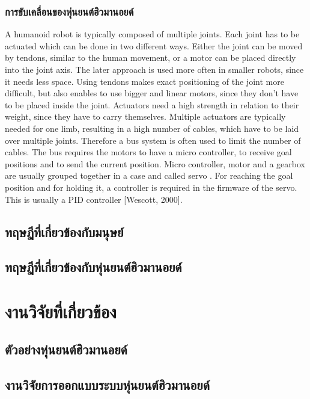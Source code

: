 \subsubsection*{การขับเคลื่อนของหุ่นยนต์ฮิวมานอยด์}
A humanoid robot is typically composed of multiple joints.  Each joint has to be
actuated which can be done in two different ways.  Either the joint can be moved
by tendons, similar to the human movement, or a motor can be placed directly into
the  joint  axis.   The  later  approach  is  used  more  often  in  smaller  robots,  since  it
needs less space.  Using tendons makes exact positioning of the joint more difficult,
but also enables to use bigger and linear motors, since they don’t have to be placed
inside the joint.
Actuators need a high strength in relation to their weight, since they have to carry
themselves.  Multiple actuators are typically needed for one limb, resulting in a high
number of cables, which have to be laid over multiple joints.  Therefore a bus system
is often used to limit the number of cables.  The bus requires the motors to have a
micro controller, to receive goal positions and to send the current position.  Micro
controller, motor and a gearbox are usually grouped together in a case and called
servo
.  For reaching the goal position and for holding it, a controller is required in
the firmware of the servo.  This is usually a PID controller [Wescott, 2000].

\clearpage
\subsection{ทฤษฏีที่เกี่ยวข้องกับมนุษย์}

\subsection{ทฤษฏีที่เกี่ยวข้องกับหุ่นยนต์ฮิวมานอยด์}


\clearpage
\section{งานวิจัยที่เกี่ยวข้อง}
\subsection{ตัวอย่างหุ่นยนต์ฮิวมานอยด์}


\clearpage
\subsection{งานวิจัยการออกแบบระบบหุ่นยนต์ฮิวมานอยด์}


